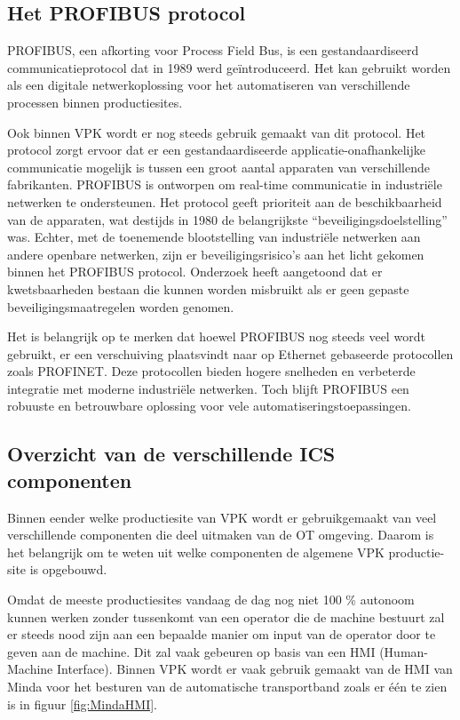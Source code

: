 \subsection{Het PROFIBUS protocol}
PROFIBUS, een afkorting voor Process Field Bus, is een gestandaardiseerd communicatieprotocol dat in 1989 werd geïntroduceerd. Het kan gebruikt worden als een digitale netwerkoplossing voor het automatiseren van verschillende processen binnen productiesites. \autocite{Profibus2022}

\vspace{5mm}
Ook binnen VPK wordt er nog steeds gebruik gemaakt van dit protocol.
Het protocol zorgt ervoor dat er een gestandaardiseerde applicatie-onafhankelijke communicatie mogelijk is tussen een groot aantal apparaten van verschillende fabrikanten. \autocite{Profibus2022}
PROFIBUS is ontworpen om real-time communicatie in industriële netwerken te ondersteunen. Het protocol geeft prioriteit aan de beschikbaarheid van de apparaten, wat destijds in 1980 de belangrijkste “beveiligingsdoelstelling” was. Echter, met de toenemende blootstelling van industriële netwerken aan andere openbare netwerken, zijn er beveiligingsrisico’s aan het licht gekomen binnen het PROFIBUS protocol. Onderzoek heeft aangetoond dat er kwetsbaarheden bestaan die kunnen worden misbruikt als er geen gepaste beveiligingsmaatregelen worden genomen. \autocite{Watson2017}

\vspace{5mm}
Het is belangrijk op te merken dat hoewel PROFIBUS nog steeds veel wordt gebruikt, er een verschuiving plaatsvindt naar op Ethernet gebaseerde protocollen zoals PROFINET. Deze protocollen bieden hogere snelheden en verbeterde integratie met moderne industriële netwerken. Toch blijft PROFIBUS een robuuste en betrouwbare oplossing voor vele automatiseringstoepassingen. \autocite{Aminaie2020}


\subsection{Overzicht van de verschillende ICS componenten}
Binnen eender welke productiesite van VPK wordt er gebruikgemaakt van veel verschillende componenten die deel uitmaken van de OT omgeving. Daarom is het belangrijk om te weten uit welke componenten de algemene VPK productie-site is opgebouwd. 

Omdat de meeste productiesites vandaag de dag nog niet 100 \% autonoom kunnen werken zonder tussenkomt van een operator die de machine bestuurt zal er steeds nood zijn aan een bepaalde manier om input van de operator door te geven aan de machine. Dit zal vaak gebeuren op basis van een HMI (Human-Machine Interface). Binnen VPK wordt er vaak gebruik gemaakt van de HMI van Minda voor het besturen van de automatische transportband zoals er één te zien is in figuur \ref{fig:MindaHMI}.

